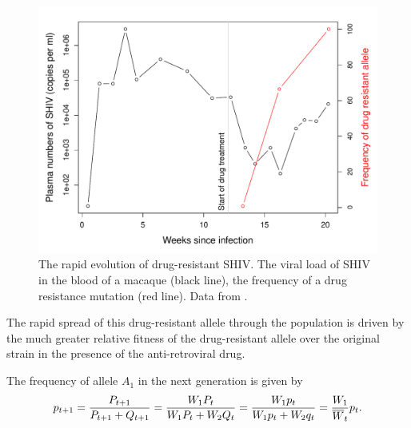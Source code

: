 \begin{figure}
\begin{center}
\includegraphics[width= \textwidth]{Journal_figs/single_locus_selection/Feder_HIV/Feder_HIV.pdf}
\end{center}
\caption{The rapid evolution of drug-resistant SHIV. The viral load of
  SHIV in the blood of a macaque (black line), the frequency of a drug
  resistance mutation (red line). Data from \citet{feder2017}. } \label{fig:HIV_viral_freqs}
\end{figure}
The rapid spread of this drug-resistant allele through the population is driven by the much greater relative fitness of the drug-resistant allele over the original strain in the presence of the anti-retroviral drug. 

The frequency of allele $A_1$ in the next generation is given by
\begin{equation}
	\label{eq:eq:recHaplMod1}
	p_{t+1} = \frac{P_{t+1}}{P_{t+1} + Q_{t+1}} = \frac{W_1 P_t}{W_1 P_t + W_2 Q_t}
	= \frac{W_1 p_t}{W_1 p_t + W_2 q_t} = \frac{W_1}{\overline{W}_t} p_t.
\end{equation}

